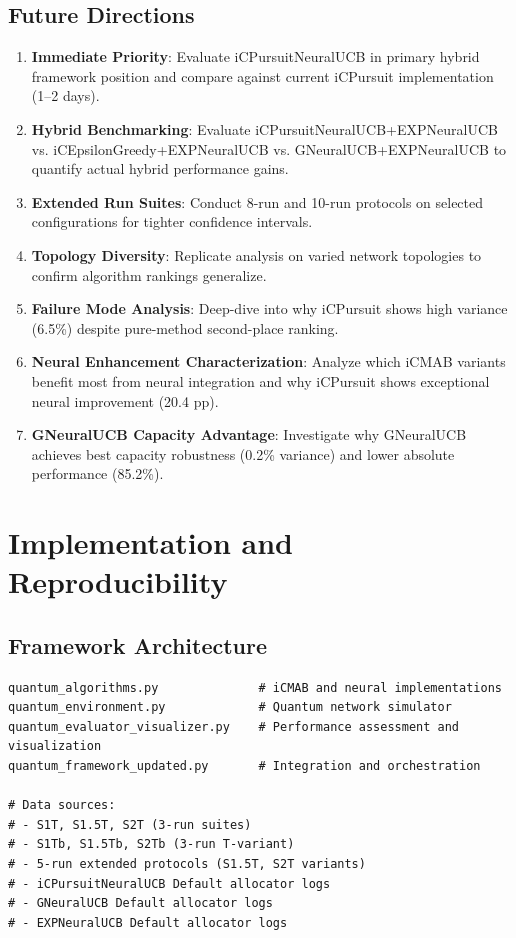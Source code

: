 \documentclass[12pt,a4paper]{article}
\begin{document}
\subsection{Future Directions}
\begin{enumerate}
\item \textbf{Immediate Priority}: Evaluate iCPursuitNeuralUCB in primary hybrid framework position and compare against current iCPursuit implementation (1--2 days).
\item \textbf{Hybrid Benchmarking}: Evaluate iCPursuitNeuralUCB+EXPNeuralUCB vs. iCEpsilonGreedy+EXPNeuralUCB vs. GNeuralUCB+EXPNeuralUCB to quantify actual hybrid performance gains.
\item \textbf{Extended Run Suites}: Conduct 8-run and 10-run protocols on selected configurations for tighter confidence intervals.
\item \textbf{Topology Diversity}: Replicate analysis on varied network topologies to confirm algorithm rankings generalize.
\item \textbf{Failure Mode Analysis}: Deep-dive into why iCPursuit shows high variance (6.5\%) despite pure-method second-place ranking.
\item \textbf{Neural Enhancement Characterization}: Analyze which iCMAB variants benefit most from neural integration and why iCPursuit shows exceptional neural improvement (20.4 pp).
\item \textbf{GNeuralUCB Capacity Advantage}: Investigate why GNeuralUCB achieves best capacity robustness (0.2\% variance) and lower absolute performance (85.2\%).
\end{enumerate}

\section{Implementation and Reproducibility}

\subsection{Framework Architecture}
\begin{lstlisting}[caption=Core iCMAB Framework Components]
quantum_algorithms.py              # iCMAB and neural implementations
quantum_environment.py             # Quantum network simulator
quantum_evaluator_visualizer.py    # Performance assessment and visualization
quantum_framework_updated.py       # Integration and orchestration

# Data sources:
# - S1T, S1.5T, S2T (3-run suites)
# - S1Tb, S1.5Tb, S2Tb (3-run T-variant)
# - 5-run extended protocols (S1.5T, S2T variants)
# - iCPursuitNeuralUCB Default allocator logs
# - GNeuralUCB Default allocator logs
# - EXPNeuralUCB Default allocator logs
\end{lstlisting}
\end{document}
